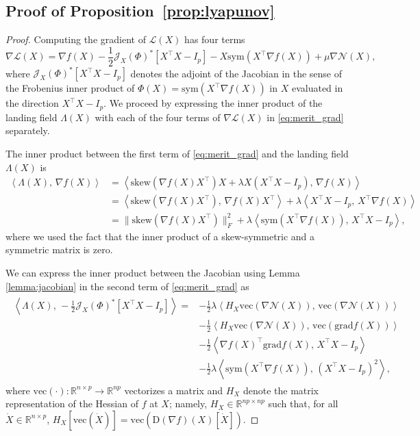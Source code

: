 \documentclass[twoside,11pt]{article}
\newcommand{\grad}{{\mathrm{grad}}}
\newcommand{\sk}{{\mathrm{skew}}}
\newcommand{\sym}{{\mathrm{sym}}}
\newcommand{\Jacob}[2]{\mathcal{J}_{#2}\left(#1\right)}
\newcommand{\vect}[1]{\mathrm{vec}\left(#1\right)}
\newcommand{\cN}{\mathcal{N}} %
\newcommand{\cL}{\mathcal{L}} %
\newcommand{\vectHess}[1]{H_{#1}} %
\newcommand{\nfX}{\nabla f(X)} %
\newcommand{\inner}[2]{\left\langle#1,\,#2\right\rangle} %
\begin{document}
\subsection{Proof of Proposition~\ref{prop:lyapunov}}
\begin{proof}
    Computing the gradient of $\cL(X)$ has four terms
    \begin{equation}\label{eq:merit_grad}
        \nabla \cL(X) = \nabla f(X) -\frac12 \Jacob{\Phi}{X}^* [X^{\top}X - I_p] - X\sym(X^\top \nabla f(X)) + \mu \nabla \cN(X),
    \end{equation}
    where $\Jacob{\Phi}{X}^* [X^{\top}X - I_p]$ denotes the adjoint of the Jacobian in the sense of the Frobenius inner product of $\Phi(X) = \sym(X^\top \nabla f(X))$ in $X$ evaluated in the direction $X^\top X - I_p$. We proceed by expressing the inner product of the landing field $\Lambda(X)$ with each of the four terms of $\nabla \cL(X)$ in \eqref{eq:merit_grad} separately.
    
    The inner product between the first term of \eqref{eq:merit_grad} and the landing field $\Lambda(X)$ is
    \begin{align}
        \inner{\Lambda(X)}{\nabla f(X)} &= \inner{\sk(\nabla f(X) X^\top)X + \lambda X (X^\top X - I_p)}{\nabla f(X)}\\
        &= \inner{\sk(\nabla f(X) X^\top)}{\nabla f(X)X^\top} + \lambda\inner{X^\top X - I_p}{X^\top \nabla f(X)}\\
        & = \| \sk(\nabla f(X) X^\top) \|_F^2 + \lambda \inner{\sym(X^\top \nabla f(X))}{X^{\top}X -I_p}, \label{eq:merit_inner1}
    \end{align}
    where we used the fact that the inner product of a skew-symmetric and a symmetric matrix is zero.

    We can express the inner product between the Jacobian using Lemma \ref{lemma:jacobian} in the second term of \eqref{eq:merit_grad} as 
    \begin{align}
        \begin{split}
        \inner{\Lambda(X)}{-\frac12 \Jacob{\Phi}{X}^* [X^{\top}X - I_p]} = &-\frac12\lambda           \inner{\vectHess{X} \vect{ \nabla \cN(X)}}{ \vect{\nabla \cN(X)}} \\
            \qquad & -\frac12\inner{\vectHess{X} \vect{ \nabla \cN(X)}}{\vect{\grad f(X)}}\\
            \qquad & -\frac12\inner{\nfX^{\top} \grad f(X)}{X^{\top}X - I_p} \\
            \qquad & -\frac12\lambda \inner{\sym(X^\top \nabla f(X))}{(X^{\top}X - I_p)^2}, 
        \end{split}\label{eq:merit_inner2}
    \end{align}
    where $\vect{\cdot}:\mathbb{R}^{n\times p} \rightarrow \mathbb{R}^{np}$ vectorizes a matrix and $\vectHess{X}$ denote the matrix representation of the Hessian of $f$ at $X$; namely, $\vectHess{X} \in \mathbb{R}^{np\times np}$ such that, for all $\dot{X}\in\mathbb{R}^{n\times p}$, $\vectHess{X}[\vect{\dot{X}}] = \vect{\mathrm{D}(\nabla f)(X)[\dot{X}]}$.
    

\end{proof}
\end{document}
